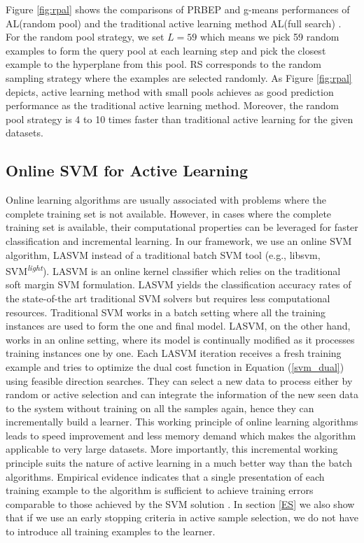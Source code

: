 Figure \ref{fig:rpal} shows the comparisons of PRBEP and g-means performances of AL(random pool) and the traditional active learning method AL(full search) \cite{Tong_2002}. For the random pool strategy, we set $L=59$ which means we pick 59 random examples to form the query pool  at each learning step and pick the closest example to the hyperplane from this pool. RS corresponds to the random sampling strategy where the examples are selected randomly. As Figure \ref{fig:rpal} depicts, active learning method with small pools achieves as good prediction performance as the traditional active learning method. Moreover, the random pool strategy is 4 to 10 times faster than traditional active learning for the given datasets.

\subsection{Online SVM for Active Learning}
\label{LASVM}
Online learning algorithms are usually associated with problems where the complete training set is not available. However, in cases where the complete training set is available, their computational properties can be leveraged for faster classification and incremental learning. In our framework, we use an online SVM algorithm, LASVM \cite{Bordes_2005} instead of a traditional batch SVM tool (e.g., libsvm, SVM\textsuperscript{\textit{light}}). LASVM is an online kernel classifier which relies on the traditional soft margin SVM formulation. LASVM yields the classification accuracy rates of the state-of-the art traditional SVM solvers but requires less computational resources. Traditional SVM works in a batch setting where all the training instances are used to form the one and final model. LASVM, on the other hand, works in an online setting, where its model is continually modified as it processes training instances one by one. Each LASVM iteration receives a fresh training example and tries to optimize the dual cost function in Equation (\ref{svm_dual}) using feasible direction searches.
They can select a new data to process either by random or active selection and can integrate the information of the new seen data to the system without training on all the samples again, hence they can incrementally build a learner. This working principle of online learning algorithms leads to speed improvement and less memory demand which makes the algorithm applicable to very large datasets. More importantly, this incremental working principle suits the nature of active learning in a much better way than the batch algorithms. Empirical evidence indicates that a single presentation of each training example to the algorithm is sufficient to achieve training errors comparable to those achieved by the SVM solution \cite{Bordes_2005}. In section \ref{ES} we also show that if we use an early stopping criteria in active sample selection, we do not have to introduce all training examples to the learner.

